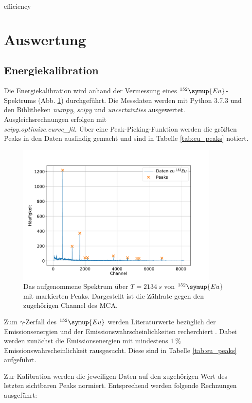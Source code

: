 efficiency\section{Auswertung}
\subsection{Energiekalibration}
Die Energiekalibration wird anhand der Vermessung eines $^{152}\symup{Eu}$-Spektrums (Abb. \ref{fig:eu_spectrum}) durchgeführt.
Die Messdaten werden mit Python 3.7.3 und den Biblitheken \textit{numpy}, \textit{scipy} und \textit{uncertainties} ausgewertet.
Ausgleichsrechnungen erfolgen mit \\\textit{scipy.optimize.curve\_fit}.
Über eine Peak-Picking-Funktion werden die größten Peaks in den Daten ausfindig gemacht und sind in Tabelle \ref{tab:eu_peaks} notiert.
\begin{figure}[h!]
  \centering
  \includegraphics[width=0.9\textwidth]{content/images/spektrum_europium.pdf}
  \caption{Das aufgenommene Spektrum über $T=\SI{2134}{s}$ von $^{152}\symup{Eu}$ mit markierten Peaks. Dargestellt ist die Zählrate gegen den zugehörigen Channel des MCA.}
  \label{fig:eu_spectrum}
\end{figure}
Zum $\gamma$-Zerfall des $^{152}\symup{Eu}$ werden Literaturwerte bezüglich der Emissionsenergien und der Emissionswahrscheinlichkeiten recherchiert \cite{nucleide}.
Dabei werden zunächst die Emissionsenergien mit mindestens $\SI{1}{\%}$ Emissionswahrscheinlichkeit rausgesucht.
Diese sind in Tabelle \ref{tab:eu_peaks} aufgeführt.

Zur Kalibration werden die jeweiligen Daten auf den zugehörigen Wert des letzten sichtbaren Peaks normiert.
Entsprechend werden folgende Rechnungen ausgeführt:
